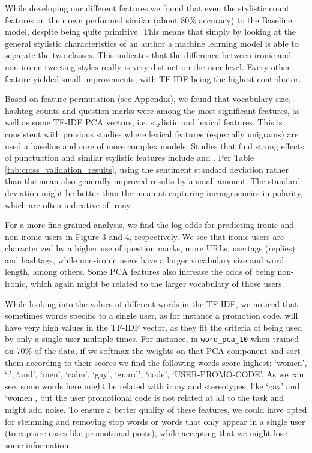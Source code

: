 While developing our different features we found that even the stylistic count features on their own performed similar (about 80\% accuracy) to the Baseline model, despite being quite primitive. This means that simply by looking at the general stylistic characteristics of an author a machine learning model is able to separate the two classes. This indicates that the difference between ironic and non-ironic tweeting styles really is very distinct on the user level. Every other feature yielded small improvements, with TF-IDF being the highest contributor. 



Based on feature permutation (see Appendix), we found that vocabulary size, hashtag counts and question marks were among the most significant features, as well as some TF-IDF PCA vectors, i.e. stylistic and lexical features. This is consistent with previous studies \cite{gonzalez2011identifying, joshi2015harnessing} where lexical features (especially unigrams) are used a baseline and core of more complex models. Studies that find strong effects of punctuation and similar stylistic features include  and . Per Table \ref{tab:cross_validation_results}, using the sentiment standard deviation rather than the mean also generally improved results by a small amount. The standard deviation might be better than the mean at capturing incongruencies in polarity, which are often indicative of irony. 

For a more fine-grained analysis, we find the log odds for predicting ironic and non-ironic users in Figure 3 and 4, respectively. We see that ironic users are characterized by a higher use of question marks, more URLs, usertags (replies) and hashtags, while non-ironic users have a larger vocabulary size and word length, among others. Some PCA features also increase the odds of being non-ironic, which again might be related to the larger vocabulary of those users.

While looking into the values of different words in the TF-IDF, we noticed that sometimes words specific to a single user, as for instance a promotion code, will have very high values in the TF-IDF vector, as they fit the criteria of being used by only a single user multiple times. For instance, in \verb'word_pca_10' when trained on 70\% of the data, if we softmax the weights on that PCA component and sort them according to their scores we find the following words score highest: `women', `:', `and', `men', `calm',  `gay', `guard', `code', `USER-PROMO-CODE'. As we can see, some words here might be related with irony and stereotypes, like `gay' and `women', but the user promotional code is not related at all to the task and might add noise. To ensure a better quality of these features, we could have opted for stemming and removing stop words or words that only appear in a single user (to capture cases like promotional posts), while accepting that we might lose some information.

